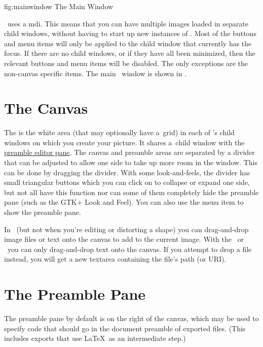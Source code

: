 \FloatFig
  {fig:mainwindow}
  {}
  {The Main Window}

\FlowframTk\ uses a \gls{mdi}. This means that you can have multiple
images loaded in separate child windows, without having to start up
new instances of \FlowframTk. Most of the buttons and menu items
will only be applied to the child window that currently has the
focus. If there are no child windows, or if they have all been
minimized, then the relevant buttons and menu items will be disabled.
The only exceptions are the non-\gls{canvas} specific items.
The main \FlowframTk\ window is shown in .


\section{The Canvas}\label{sec:thecanvas}

The  is the white area (that may optionally
have a~grid) in each of \FlowframTk's child windows on which you create
your picture. It shares a~child window with the
\hyperref[sec:thepreamblepane]{preamble editor pane}. The canvas and
preamble areas are separated by a divider that can be adjusted to
allow one side to take up more room in the window. This can be done
by dragging the divider.  With some \glspl{look-and-feel}, the
divider has small triangular buttons which you can click on to
collapse or expand one side, but not all have this function nor can
some of them completely hide the preamble pane (such as the GTK+
Look and Feel).  You can also use the  menu
item to show the preamble pane.

In \selectmode\ (but not when you're editing or
distorting a shape) you can \gls{drag-and-drop} image files or
text onto the canvas to add to the current image. With the
\texttool\ or \mathstool\ you can only \gls{drag-and-drop} text onto
the canvas. If you attempt to drop a file instead, you will get a
new \gls{textarea} containing the file's path (or URI). 

\section{The Preamble Pane}\label{sec:thepreamblepane}

The preamble pane by default is on the right of the \gls{canvas},
which may be used to specify code that should go in the document
preamble of exported files. (This includes exports that use \LaTeX\
as an intermediate step.)


